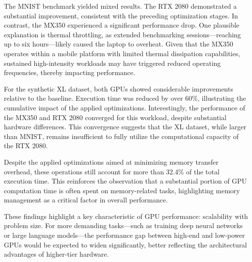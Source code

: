 \documentclass[modern,longauthor]{aastex7}
\begin{document}
The MNIST benchmark yielded mixed results. The RTX 2080 demonstrated a substantial improvement, consistent with the preceding optimization stages. In contrast, the MX350 experienced a significant performance drop. One plausible explanation is thermal throttling, as extended benchmarking sessions—reaching up to six hours—likely caused the laptop to overheat. Given that the MX350 operates within a mobile platform with limited thermal dissipation capabilities, sustained high-intensity workloads may have triggered reduced operating frequencies, thereby impacting performance.

For the synthetic XL dataset, both GPUs showed considerable improvements relative to the baseline. Execution time was reduced by over 60\%, illustrating the cumulative impact of the applied optimizations. Interestingly, the performance of the MX350 and RTX 2080 converged for this workload, despite substantial hardware differences. This convergence suggests that the XL dataset, while larger than MNIST, remains insufficient to fully utilize the computational capacity of the RTX 2080.


Despite the applied optimizations aimed at minimizing memory transfer overhead, these operations still account for more than 32.4\% of the total execution time. This reinforces the observation that a substantial portion of GPU computation time is often spent on memory-related tasks, highlighting memory management as a critical factor in overall performance.

These findings highlight a key characteristic of GPU performance: scalability with problem size. For more demanding tasks—such as training deep neural networks or large language models—the performance gap between high-end and low-power GPUs would be expected to widen significantly, better reflecting the architectural advantages of higher-tier hardware.
\end{document}
